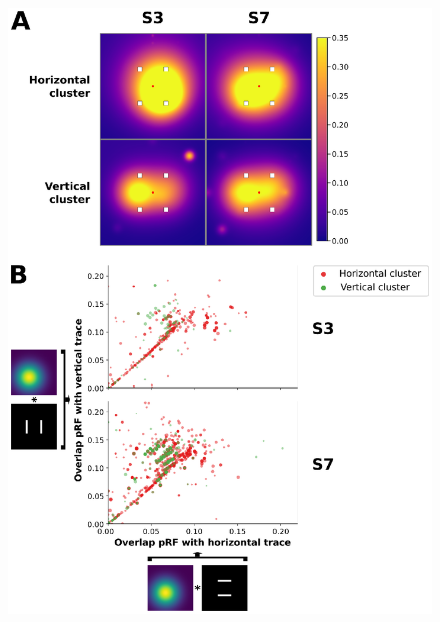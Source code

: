 \begin{figure}[htbp!]
\captionsetup{labelformat=empty}
\centering
\includegraphics[width=\textwidth]{figures/chapter_03_SI/figS8.eps}
\caption{}
\end{figure}

